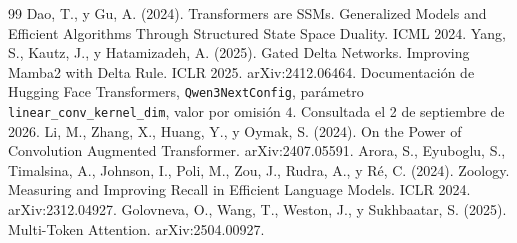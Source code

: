 \documentclass[11pt,a4paper]{article}
\begin{document}
\begin{thebibliography}{99}
 Dao, T., y Gu, A. (2024). Transformers are SSMs. Generalized Models and Efficient Algorithms Through Structured State Space Duality. ICML 2024.
 Yang, S., Kautz, J., y Hatamizadeh, A. (2025). Gated Delta Networks. Improving Mamba2 with Delta Rule. ICLR 2025. arXiv:2412.06464.
 Documentación de Hugging Face Transformers, \texttt{Qwen3NextConfig}, parámetro \texttt{linear\_conv\_kernel\_dim}, valor por omisión $4$. Consultada el 2 de septiembre de 2026.
 Li, M., Zhang, X., Huang, Y., y Oymak, S. (2024). On the Power of Convolution Augmented Transformer. arXiv:2407.05591.
 Arora, S., Eyuboglu, S., Timalsina, A., Johnson, I., Poli, M., Zou, J., Rudra, A., y R\'e, C. (2024). Zoology. Measuring and Improving Recall in Efficient Language Models. ICLR 2024. arXiv:2312.04927.
 Golovneva, O., Wang, T., Weston, J., y Sukhbaatar, S. (2025). Multi-Token Attention. arXiv:2504.00927.
\end{thebibliography}
\end{document}

